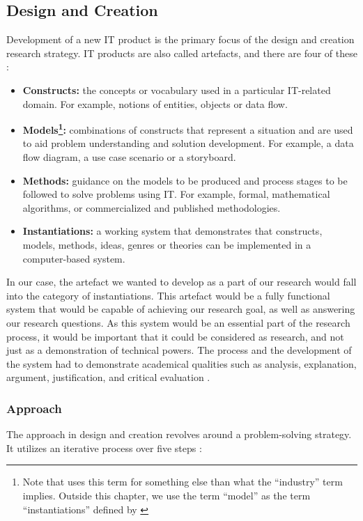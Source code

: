 \subsection{Design and Creation}
\label{sec:design_and_creation}
Development of a new IT product is the primary focus of the design and creation research strategy. IT products are also called artefacts, and there are four of these \citep{march1995design, oates2005researching}:

\begin{itemize}
    \item\textbf{Constructs:} the concepts or vocabulary used in a particular IT-related domain. For example, notions of entities, objects or data flow.
    \item\textbf{Models\footnote{Note that \cite{oates2005researching} uses this term for something else than what the ``industry'' term implies. Outside this chapter, we use the term ``model'' as the term ``instantiations'' defined by \cite{oates2005researching}}:} combinations of constructs that represent a situation and are used to aid problem understanding and solution development. For example, a data flow diagram, a use case scenario or a storyboard.
    \item\textbf{Methods:} guidance on the models to be produced and process stages to be followed to solve problems using IT. For example, formal, mathematical algorithms, or commercialized and published methodologies.
    \item\textbf{Instantiations:} a working system that demonstrates that constructs, models, methods, ideas, genres or theories can be implemented in a computer-based system.
\end{itemize}

In our case, the artefact we wanted to develop as a part of our research would fall into the category of instantiations. This artefact would be a fully functional system that would be capable of achieving our research goal, as well as answering our research questions.  As this system would be an essential part of the research process, it would be important that it could be considered as research, and not just as a demonstration of technical powers. The process and the development of the system had to demonstrate academical qualities such as analysis, explanation, argument, justification, and critical evaluation \citep{oates2005researching}. 

\subsubsection{Approach}
\label{methodology-design-and-creation-approach}
The approach in design and creation revolves around a problem-solving strategy. It utilizes an iterative process over five steps \citep{vaishnavi2004design, oates2005researching}:

